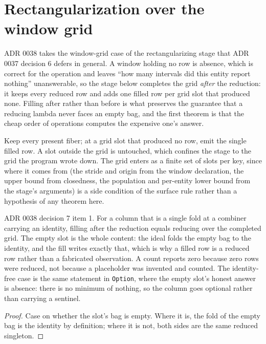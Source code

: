\section{Rectangularization over the window grid}

ADR 0038 takes the window-grid case of the rectangularizing stage that
ADR 0037 decision 6 defers in general.  A window holding no row is
absence, which is correct for the operation and leaves ``how many
intervals did this entity report nothing'' unanswerable, so the stage
below completes the grid \emph{after} the reduction: it keeps every
reduced row and adds one filled row per grid slot that produced none.
Filling after rather than before is what preserves the guarantee that a
reducing lambda never faces an empty bag, and the first theorem is that
the cheap order of operations computes the expensive one's answer.

\begin{definition}[Rectangularization]
  \label{def:dense}\leanok
  Keep every present fiber; at a grid slot that produced no row, emit the
  single filled row.  A slot outside the grid is untouched, which confines
  the stage to the grid the program wrote down.  The grid enters as a
  finite set of slots per key, since where it comes from (the stride and
  origin from the window declaration, the upper bound from closedness, the
  population and per-entity lower bound from the stage's arguments) is a
  side condition of the surface rule rather than a hypothesis of any
  theorem here.
\end{definition}

\begin{theorem}
  \label{thm:dense-ideal}\leanok
  ADR 0038 decision 7 item 1.  For a column that is a single fold at a
  combiner carrying an identity, filling after the reduction equals
  reducing over the completed grid.  The empty slot is the whole content:
  the ideal folds the empty bag to the identity, and the fill writes
  exactly that, which is why a filled row is a reduced row rather than a
  fabricated observation.  A count reports zero because zero rows were
  reduced, not because a placeholder was invented and counted.  The
  identity-free case is the same statement in \texttt{Option}, where the
  empty slot's honest answer is absence: there is no minimum of nothing,
  so the column goes optional rather than carrying a sentinel.
\end{theorem}
\begin{proof}\leanok
  Case on whether the slot's bag is empty.  Where it is, the fold of the
  empty bag is the identity by definition; where it is not, both sides are
  the same reduced singleton.
\end{proof}


